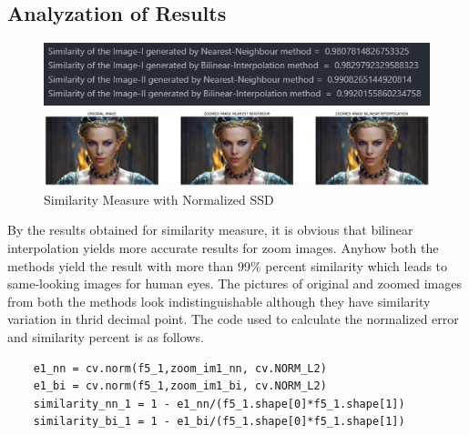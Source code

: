 \documentclass[12pt,a4paper]{article}
\begin{document}
\subsection*{Analyzation of Results}
\begin{figure}[h]
    \centering
    \begin{minipage}[c]{\textwidth}
        \centering
        \caption*{Similarity Measure with Normalized SSD}
        \includegraphics[width=.75\textwidth]{q5_2.png}
    \end{minipage}
    \begin{minipage}[c]{\textwidth}
        \centering
        \includegraphics[width=\textwidth]{q5_1.png}
    \end{minipage}
\end{figure}
By the results obtained for similarity measure, it is obvious that bilinear interpolation yields more accurate results for zoom images. Anyhow both the methods yield the result with more than 99\% percent similarity which leads to same-looking images for human eyes. The pictures of original and zoomed images from both the methods look indistinguishable although they have similarity variation in thrid decimal point. The code used to calculate the normalized error and similarity percent is as follows.
\begin{lstlisting}
    e1_nn = cv.norm(f5_1,zoom_im1_nn, cv.NORM_L2)
    e1_bi = cv.norm(f5_1,zoom_im1_bi, cv.NORM_L2)
    similarity_nn_1 = 1 - e1_nn/(f5_1.shape[0]*f5_1.shape[1])
    similarity_bi_1 = 1 - e1_bi/(f5_1.shape[0]*f5_1.shape[1])
\end{lstlisting}
\end{document}
